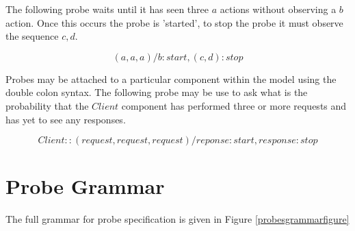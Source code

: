 \documentclass[10pt,a4paper]{article}
\begin{document}
The following probe waits until it has seen three $a$ actions without
observing a $b$ action. Once this occurs the probe is 'started', to stop
the probe it must observe the sequence $c, d$.

\begin{displaymath}
(a, a, a)/b : start, (c, d):stop
\end{displaymath}

Probes may be attached to a particular component within the model using
the double colon syntax. The following probe may be use to ask what is the
probability that the $Client$ component has performed three or more
requests and has yet to see any responses.

\begin{displaymath}
Client::(request, request, request)/reponse : start, response : stop
\end{displaymath}

\section{Probe Grammar}
\label{probegrammarsection}

The full grammar for probe specification is given in Figure
\ref{probesgrammarfigure}

\newcommand{\probegrammartopline}[3]{
$#1$ & $:=$ & $#2$ && #3
}
\newcommand{\probegrammarline}[2]{
& $\mid$ & $#1$ && #2
}
\end{document}
